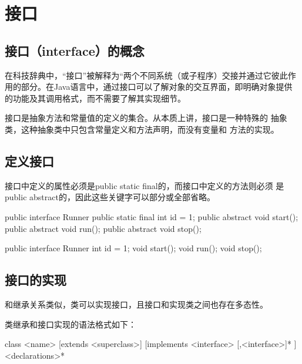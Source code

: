 \section{接口}

\subsection{接口（interface）的概念}

在科技辞典中，“接口”被解释为“两个不同系统（或子程序）交接并通过它彼此作
用的部分。在Java语言中，通过接口可以了解对象的交互界面，即明确对象提供
的功能及其调用格式，而不需要了解其实现细节。

接口是抽象方法和常量值的定义的集合。从本质上讲，接口是一种特殊的{\Red
  抽象类}，这种抽象类中{\kai\Red 只包含常量定义和方法声明，而没有变量和
  方法的实现}。


\subsection{定义接口}

接口中定义的属性必须是public static final的，而接口中定义的方法则必须
是public abstract的，因此这些关键字可以部分或全部省略。


\begin{javaCode}
  public interface Runner {
    public static final int id = 1;
    public abstract void start();
    public abstract void run();
    public abstract void stop();
  }
\end{javaCode}


\begin{javaCode}
  public interface Runner {
    int id = 1;
    void start();
    void run();
    void stop();
  }
\end{javaCode}

\subsection{接口的实现}

和继承关系类似，类可以{\Red\hei 实现}接口，且接口和实现类之间也存在多态性。

类继承和接口实现的语法格式如下：

\begin{javaCode}
  [<modifier>] class <name> [extends <superclass>] [implements <interface> [,<interface>]* ] {
    <declarations>*
  }
\end{javaCode}



